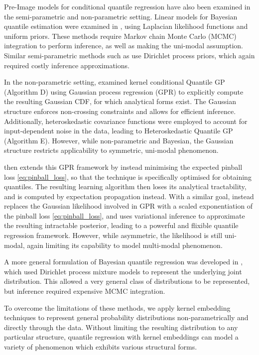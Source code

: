 \documentclass[twoside]{article} \usepackage{aistats2017}
\theoremstyle{definition}
\theoremstyle{theorem}
\begin{document}
	Pre-Image models for conditional quantile regression have also been examined in the semi-parametric and non-parametric setting. Linear models for Bayesian quantile estimation were examined in \cite{yu2001bayesian}, using Laplacian likelihood functions and uniform priors. These methods require Markov chain Monte Carlo (MCMC) integration to perform inference, as well as making the uni-modal assumption. Similar semi-parametric methods such as \cite{hjort2007nonparametric, hjort2009quantile} use Dirichlet process priors, which again required costly inference approximations.
	
	In the non-parametric setting, \cite{quadrianto2009kernel} examined kernel conditional Quantile GP (Algorithm D) using Gaussian process regression (GPR) \citep{rasmussen2006gaussian} to explicitly compute the resulting Gaussian CDF, for which analytical forms exist. The Gaussian structure enforces non-crossing constraints and allows for efficient inference. Additionally, heteroskedastic covariance functions were employed to account for input-dependent noise in the data, leading to Heteroskedastic Quantile GP (Algorithm E). However, while non-parametric and Bayesian, the Gaussian structure restricts applicability to symmetric, uni-modal phenomenon.
	
	\cite{boukouvalas2012gaussian} then extends this GPR framework by instead minimising the expected pinball loss \eqref{eq:pinball_loss}, so that the technique is specifically optimised for obtaining quantiles. The resulting learning algorithm then loses its analytical tractability, and is computed by expectation propagation instead. With a similar goal, \cite{abeywardana2015variational} instead replaces the Gaussian likelihood involved in GPR with a scaled exponentiation of the pinball loss \eqref{eq:pinball_loss}, and uses variational inference to approximate the resulting intractable posterior, leading to a powerful and flixible quantile regression framework. However, while asymmetric, the likelihood is still uni-modal, again limiting its capability to model multi-modal phenomenon.
	 
	A more general formulation of Bayesian quantile regression was developed in \cite{taddy2012bayesian}, which used Dirichlet process mixture models to represent the underlying joint distribution. This allowed a very general class of distributions to be represented, but inference required expensive MCMC integration.
	
	To overcome the limitations of these methods, we apply kernel embedding techniques to represent general probability distributions non-parametrically and directly through the data. Without limiting the resulting distribution to any particular structure, quantile regression with kernel embeddings can model a variety of phenomenon which exhibits various structural forms.
	
\end{document}
